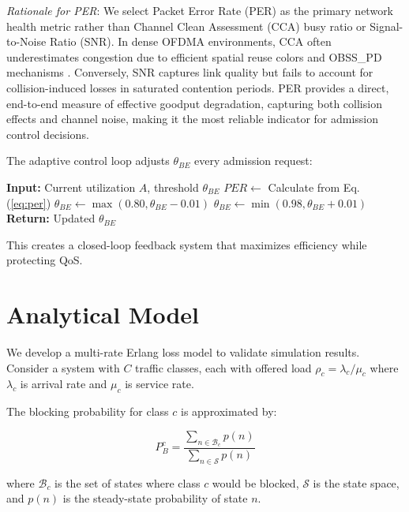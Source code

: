 \documentclass[conference]{IEEEtran}
\begin{document}
\textit{Rationale for PER}: We select Packet Error Rate (PER) as the primary network health metric rather than Channel Clean Assessment (CCA) busy ratio or Signal-to-Noise Ratio (SNR). In dense OFDMA environments, CCA often underestimates congestion due to efficient spatial reuse colors and OBSS\_PD mechanisms \cite{10}. Conversely, SNR captures link quality but fails to account for collision-induced losses in saturated contention periods. PER provides a direct, end-to-end measure of effective goodput degradation, capturing both collision effects and channel noise, making it the most reliable indicator for admission control decisions.

The adaptive control loop adjusts $\theta_{BE}$ every admission request:

\begin{algorithm}[H]
\caption{AS-CAC+ Adaptive Threshold Adjustment}
\label{alg:ascac_plus}
\begin{algorithmic}[1]
\STATE \textbf{Input:} Current utilization $A$, threshold $\theta_{BE}$
\STATE $PER \gets$ Calculate from Eq. (\ref{eq:per})
    \STATE $\theta_{BE} \gets \max(0.80, \theta_{BE} - 0.01)$ 
    \STATE $\theta_{BE} \gets \min(0.98, \theta_{BE} + 0.01)$ 
\ENDIF
\STATE \textbf{Return:} Updated $\theta_{BE}$
\end{algorithmic}
\end{algorithm}

This creates a closed-loop feedback system that maximizes efficiency while protecting QoS.

\section{Analytical Model}

We develop a multi-rate Erlang loss model to validate simulation results. Consider a system with $C$ traffic classes, each with offered load $\rho_c = \lambda_c / \mu_c$ where $\lambda_c$ is arrival rate and $\mu_c$ is service rate.

The blocking probability for class $c$ is approximated by:

\begin{equation}
P_B^c = \frac{\sum_{n \in \mathcal{B}_c} p(n)}{\sum_{n \in \mathcal{S}} p(n)}
\label{eq:erlang_blocking}
\end{equation}

where $\mathcal{B}_c$ is the set of states where class $c$ would be blocked, $\mathcal{S}$ is the state space, and $p(n)$ is the steady-state probability of state $n$.
\end{document}
